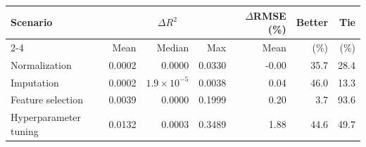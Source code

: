 \begin{tabular}{lrrrrrr}
\toprule
\textbf{Scenario} & \multicolumn{3}{c}{\textbf{$\Delta R^2$}} & \textbf{$\Delta$RMSE (\%)} & \textbf{Better} & \textbf{Tie} \\
\cmidrule(lr){2-4}
& Mean & Median & Max & Mean & (\%) & (\%) \\
\midrule
Normalization & 0.0002 & 0.0000 & 0.0330 & -0.00 & 35.7 & 28.4 \\
Imputation & 0.0002 & $1.9\times10^{-5}$ & 0.0038 & 0.04 & 46.0 & 13.3 \\
Feature selection & 0.0039 & 0.0000 & 0.1999 & 0.20 & 3.7 & 93.6 \\
Hyperparameter tuning & 0.0132 & 0.0003 & 0.3489 & 1.88 & 44.6 & 49.7 \\
\bottomrule
\end{tabular}

